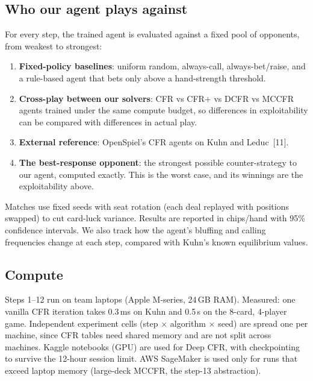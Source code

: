 \documentclass[10pt,a4paper]{article}
\begin{document}
\subsection{Who our agent plays against}
For every step, the trained agent is evaluated against a fixed pool of opponents, from weakest to strongest:
\begin{enumerate}
  \item \textbf{Fixed-policy baselines}: uniform random, always-call, always-bet/raise, and a rule-based agent that bets only above a hand-strength threshold.
  \item \textbf{Cross-play between our solvers}: CFR vs CFR+ vs DCFR vs MCCFR agents trained under the same compute budget, so differences in exploitability can be compared with differences in actual play.
  \item \textbf{External reference}: OpenSpiel's CFR agents on Kuhn and Leduc~[11].
  \item \textbf{The best-response opponent}: the strongest possible counter-strategy to our agent, computed exactly. This is the worst case, and its winnings are the exploitability above.
\end{enumerate}
Matches use fixed seeds with seat rotation (each deal replayed with positions swapped) to cut card-luck variance. Results are reported in chips/hand with 95\% confidence intervals. We also track how the agent's bluffing and calling frequencies change at each step, compared with Kuhn's known equilibrium values.

\subsection{Compute}
Steps 1--12 run on team laptops (Apple M-series, 24\,GB RAM). Measured: one vanilla CFR iteration takes 0.3\,ms on Kuhn and 0.5\,s on the 8-card, 4-player game. Independent experiment cells (step $\times$ algorithm $\times$ seed) are spread one per machine, since CFR tables need shared memory and are not split across machines. Kaggle notebooks (GPU) are used for Deep CFR, with checkpointing to survive the 12-hour session limit. AWS SageMaker is used only for runs that exceed laptop memory (large-deck MCCFR, the step-13 abstraction).

\end{document}
